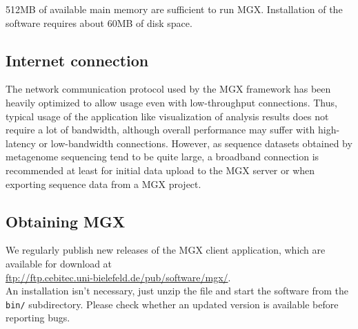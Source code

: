 512MB of available main memory are sufficient to run MGX. Installation of the
software requires about 60MB of disk space.

\subsection{Internet connection}

The network communication protocol used by the MGX framework has been heavily optimized to
allow usage even with low-throughput connections. Thus, typical usage of the application
like visualization of analysis results does not require a lot of bandwidth, although
overall performance may suffer with high-latency or low-bandwidth connections. However, as
sequence datasets obtained by metagenome sequencing tend to be quite large, a broadband 
connection is recommended at least for initial data upload to the MGX server or when exporting
sequence data from a MGX project.

\subsection{Obtaining MGX}

We regularly publish new releases of the MGX client application, which are
available for download at\\

    \url{ftp://ftp.cebitec.uni-bielefeld.de/pub/software/mgx/}.\\

An installation isn't necessary, just unzip the file and start the software
from the \texttt{bin/} subdirectory. Please check whether an updated version
is available before reporting bugs.

